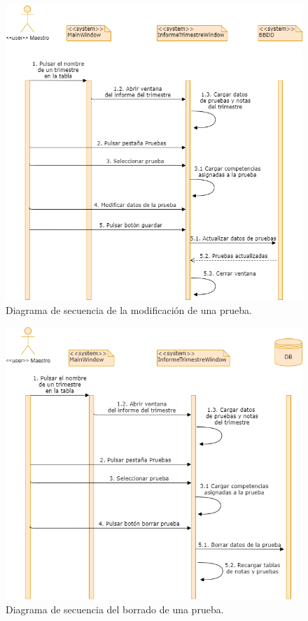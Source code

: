 \begin{figure}[h]
\centering\includegraphics[width=1\linewidth]{figs/dia_modificarprueba.png}
\caption{Diagrama de secuencia de la modificación de una prueba.}
\label{Fig:dia_modificarprueba}
\end{figure}

\begin{figure}[h]
\centering\includegraphics[width=1\linewidth]{figs/dia_borrarprueba.png}
\caption{Diagrama de secuencia del borrado de una prueba.}
\label{Fig:dia_borrarprueba}
\end{figure}

